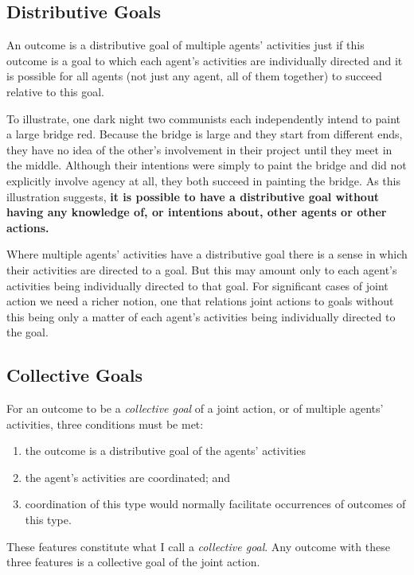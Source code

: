\documentclass[12pt,a4paper]{extarticle}
\begin{document}
\subsection{Distributive Goals}
An outcome is a distributive goal of multiple agents' activities just if this outcome is a goal to which each agent's activities are individually directed and it is possible for all agents (not just any agent, all of them together) to succeed relative to this goal.

To illustrate, one dark night two communists  each independently intend to paint a large bridge red.   
Because the bridge is large and they start from different ends, they have no idea of the other's involvement in their project until they meet in the middle.  
Although their intentions were simply to paint the bridge and did not explicitly involve agency at all, they both succeed in painting the bridge. 
As this illustration suggests, \textbf{it is possible to have a distributive goal without having any knowledge of, or intentions about, other agents or other actions.}

Where multiple agents' activities have a distributive goal there is a sense in which their activities are directed to a goal.  
But this may amount only to each agent's activities being individually directed to that goal.  
For significant cases of joint action we need a richer notion, one that relations joint actions to goals without this being only a matter of each agent's activities being individually directed to the goal.



\subsection{Collective Goals}
\label{section_collective}

For an outcome to be a \emph{collective goal} of a joint action, or of multiple agents' activities, three conditions must be met:
%
\begin{enumerate}
\item the outcome is a distributive goal of the agents' activities
\item the agent's activities are coordinated; and
\item coordination of this type would normally  facilitate occurrences of outcomes of this type.
\end{enumerate}
%
These features constitute what I call a \emph{collective goal}.  Any outcome with these three features is a collective goal of the joint action.
\end{document}

